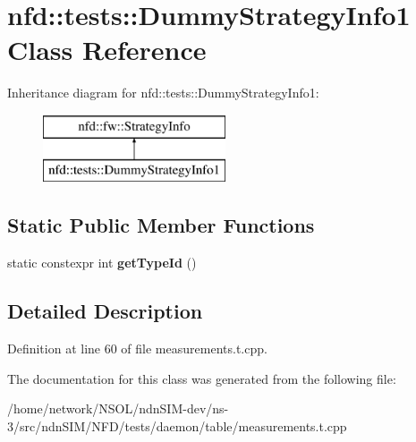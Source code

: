 \hypertarget{classnfd_1_1tests_1_1DummyStrategyInfo1}{}\section{nfd\+:\+:tests\+:\+:Dummy\+Strategy\+Info1 Class Reference}
\label{classnfd_1_1tests_1_1DummyStrategyInfo1}
Inheritance diagram for nfd\+:\+:tests\+:\+:Dummy\+Strategy\+Info1\+:\begin{figure}[H]
\begin{center}
\leavevmode
\includegraphics[height=2.000000cm]{classnfd_1_1tests_1_1DummyStrategyInfo1}
\end{center}
\end{figure}
\subsection*{Static Public Member Functions}
\begin{DoxyCompactItemize}
\item 
static constexpr int {\bfseries get\+Type\+Id} ()\hypertarget{classnfd_1_1tests_1_1DummyStrategyInfo1_a4a04059424259dc4f2b7cd294873a6ff}{}\label{classnfd_1_1tests_1_1DummyStrategyInfo1_a4a04059424259dc4f2b7cd294873a6ff}

\end{DoxyCompactItemize}


\subsection{Detailed Description}


Definition at line 60 of file measurements.\+t.\+cpp.



The documentation for this class was generated from the following file\+:\begin{DoxyCompactItemize}
\item 
/home/network/\+N\+S\+O\+L/ndn\+S\+I\+M-\/dev/ns-\/3/src/ndn\+S\+I\+M/\+N\+F\+D/tests/daemon/table/measurements.\+t.\+cpp\end{DoxyCompactItemize}
